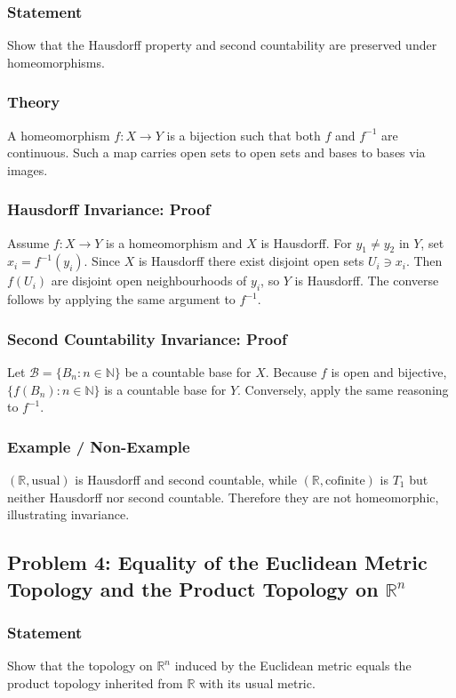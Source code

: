 \documentclass[12pt,a4paper]{article}
\theoremstyle{plain}
\theoremstyle{definition}
\theoremstyle{remark}
\theoremstyle{remark}
\begin{document}
\subsubsection*{Statement}
Show that the Hausdorff property and second countability are preserved under homeomorphisms.

\subsubsection*{Theory}
A homeomorphism $f:X\to Y$ is a bijection such that both $f$ and $f^{-1}$ are continuous. Such a map carries open sets to open sets and bases to bases via images.

\subsubsection*{Hausdorff Invariance: Proof}
Assume $f:X\to Y$ is a homeomorphism and $X$ is Hausdorff. For $y_1\neq y_2$ in $Y$, set $x_i=f^{-1}(y_i)$. Since $X$ is Hausdorff there exist disjoint open sets $U_i\ni x_i$. Then $f(U_i)$ are disjoint open neighbourhoods of $y_i$, so $Y$ is Hausdorff. The converse follows by applying the same argument to $f^{-1}$.

\subsubsection*{Second Countability Invariance: Proof}
Let $\mathcal{B}=\{B_n:n\in\mathbb{N}\}$ be a countable base for $X$. Because $f$ is open and bijective, $\{f(B_n):n\in\mathbb{N}\}$ is a countable base for $Y$. Conversely, apply the same reasoning to $f^{-1}$.

\subsubsection*{Example / Non-Example}
$(\mathbb{R},\text{usual})$ is Hausdorff and second countable, while $(\mathbb{R},\text{cofinite})$ is $T_1$ but neither Hausdorff nor second countable. Therefore they are not homeomorphic, illustrating invariance.

\bigskip

\subsection*{Problem 4: Equality of the Euclidean Metric Topology and the Product Topology on $\mathbb{R}^n$}

\subsubsection*{Statement}
Show that the topology on $\mathbb{R}^n$ induced by the Euclidean metric equals the product topology inherited from $\mathbb{R}$ with its usual metric.
\end{document}
